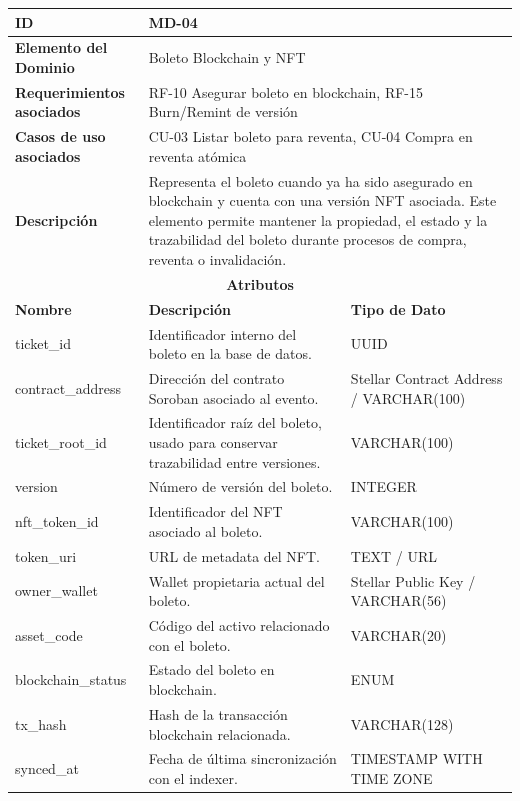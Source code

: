 \documentclass[12pt,letterpaper]{article}
\begin{document}
\begin{table}[H]
\centering
\scriptsize
\renewcommand{\arraystretch}{1.12}
\setlength{\tabcolsep}{4pt}

\begin{tabularx}{\textwidth}{|p{3.2cm}|X|p{3.8cm}|}
\hline
\textbf{ID} & MD-04 & \\ \hline

\textbf{Elemento del Dominio} & 
\multicolumn{2}{X|}{Boleto Blockchain y NFT} \\ \hline

\textbf{Requerimientos asociados} & 
\multicolumn{2}{X|}{RF-10 Asegurar boleto en blockchain, RF-15 Burn/Remint de versión} \\ \hline

\textbf{Casos de uso asociados} & 
\multicolumn{2}{X|}{CU-03 Listar boleto para reventa, CU-04 Compra en reventa atómica} \\ \hline

\textbf{Descripción} & 
\multicolumn{2}{X|}{Representa el boleto cuando ya ha sido asegurado en blockchain y cuenta con una versión NFT asociada. Este elemento permite mantener la propiedad, el estado y la trazabilidad del boleto durante procesos de compra, reventa o invalidación.} \\ \hline

\multicolumn{3}{|c|}{\textbf{Atributos}} \\ \hline

\textbf{Nombre} & \textbf{Descripción} & \textbf{Tipo de Dato} \\ \hline

ticket\_id & Identificador interno del boleto en la base de datos. & UUID \\ \hline
contract\_address & Dirección del contrato Soroban asociado al evento. & Stellar Contract Address / VARCHAR(100) \\ \hline
ticket\_root\_id & Identificador raíz del boleto, usado para conservar trazabilidad entre versiones. & VARCHAR(100) \\ \hline
version & Número de versión del boleto. & INTEGER \\ \hline
nft\_token\_id & Identificador del NFT asociado al boleto. & VARCHAR(100) \\ \hline
token\_uri & URL de metadata del NFT. & TEXT / URL \\ \hline
owner\_wallet & Wallet propietaria actual del boleto. & Stellar Public Key / VARCHAR(56) \\ \hline
asset\_code & Código del activo relacionado con el boleto. & VARCHAR(20) \\ \hline
blockchain\_status & Estado del boleto en blockchain. & ENUM \\ \hline
tx\_hash & Hash de la transacción blockchain relacionada. & VARCHAR(128) \\ \hline
synced\_at & Fecha de última sincronización con el indexer. & TIMESTAMP WITH TIME ZONE \\ \hline


\end{tabularx}
\end{table}
\end{document}
